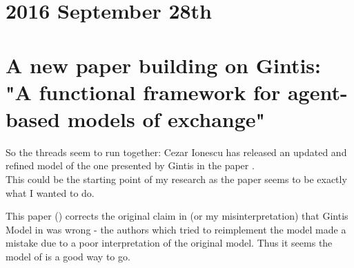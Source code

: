 \section*{2016 September 28th}

\section{A new paper building on Gintis: "A functional framework for agent-based models of exchange" \cite{Botta20114025} }
So the threads seem to run together: Cezar Ionescu has released an updated and refined model of the one presented by Gintis in the paper \cite{Botta20114025}. \\
This could be the starting point of my research as the paper seems to be exactly what I wanted to do. 

\bigskip

This paper (\cite{Botta20114025}) corrects the original claim in \cite{Ionescu2013} (or my misinterpretation) that Gintis Model in \cite{Gintis2006} was wrong - the authors which tried to reimplement the model made a mistake due to a poor interpretation of the original model. Thus it seems the model of \cite{Gintis2006} is a good way to go. 